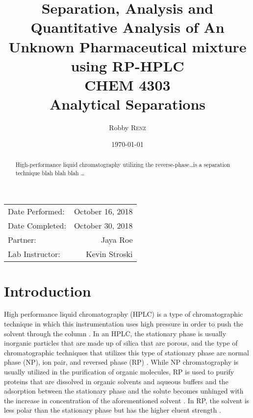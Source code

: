 \documentclass[a4paper, 12pt]{article}
\title{Separation, Analysis and Quantitative Analysis of An Unknown Pharmaceutical mixture using RP-HPLC \\ CHEM 4303 \\ Analytical Separations} %
\author{Robby \textsc{Renz}} %
\date{\today} %
\begin{document}
\maketitle %

\begin{center}
\begin{tabular}{l r}
Date Performed: & October 16, 2018 \\ %
Date Completed: & October 30, 2018 \\
Partner: & Jaya Roe \\ %
Lab Instructor: & Kevin Stroski %
\end{tabular}
\end{center}


\begin{abstract}
	High-performance liquid chromatography utilizing the reverse-phase\dots{}is a separation technique blah blah blah \dots
\end{abstract}
\newpage


\section{Introduction}
High performance liquid chromatography (HPLC) is a type of chromatographic technique in which this instrumentation uses high pressure in order to push the solvent through the column \cite{harris}. In an HPLC, the stationary phase is usually inorganic particles that are made up of silica that are porous, and the type of chromatographic techniques that utilizes this type of stationary phase are normal phase (NP), ion pair, and reversed phase (RP) \cite{mold}. While NP chromatography is usually utilized in the purification of organic molecules, RP is used to purify proteins that are dissolved in organic solvents and aqueous buffers and the adsorption between the stationary phase and the solute becomes unhinged with the increase in concentration of the aforementioned solvent \cite{prep_hplc}. In RP, the solvent is less polar than the stationary phase but has the higher eluent strength \cite{harris}. 
\end{document}
